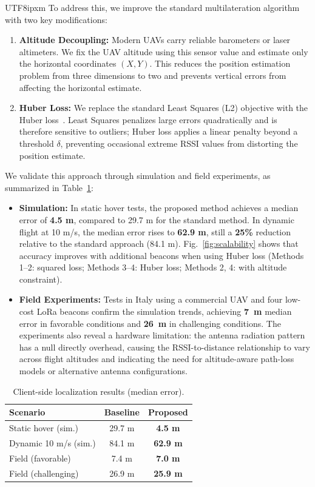 \documentclass[a4paper,10pt,twocolumn]{article}
\begin{document}
\begin{CJK}{UTF8}{ipxm}
To address this, we improve the standard multilateration algorithm with two key modifications:
\begin{enumerate}
    \item \textbf{Altitude Decoupling:} Modern UAVs carry reliable barometers or laser altimeters. We fix the UAV altitude using this sensor value and estimate only the horizontal coordinates $(X, Y)$. This reduces the position estimation problem from three dimensions to two and prevents vertical errors from affecting the horizontal estimate.
    \item \textbf{Huber Loss:} We replace the standard Least Squares (L2) objective with the Huber loss~\cite{huber1964robust}. Least Squares penalizes large errors quadratically and is therefore sensitive to outliers; Huber loss applies a linear penalty beyond a threshold $\delta$, preventing occasional extreme RSSI values from distorting the position estimate.
\end{enumerate}

We validate this approach through simulation and field experiments, as summarized in Table~\ref{tab:ch4}:
\begin{itemize}
    \item \textbf{Simulation:} In static hover tests, the proposed method achieves a median error of \textbf{4.5 m}, compared to 29.7 m for the standard method.
    In dynamic flight at 10 m/s, the median error rises to \textbf{62.9 m}, still a \textbf{25\%} reduction relative to the standard approach (84.1 m).
    Fig.~\ref{fig:scalability} shows that accuracy improves with additional beacons when using Huber loss (Methods 1--2: squared loss; Methods 3--4: Huber loss; Methods 2, 4: with altitude constraint).
    \item \textbf{Field Experiments:} Tests in Italy using a commercial UAV and four low-cost LoRa beacons confirm the simulation trends, achieving \textbf{7~m} median error in favorable conditions and \textbf{26~m} in challenging conditions.
    The experiments also reveal a hardware limitation: the antenna radiation pattern has a null directly overhead, causing the RSSI-to-distance relationship to vary across flight altitudes and indicating the need for altitude-aware path-loss models or alternative antenna configurations.
\end{itemize}

\begin{table}[t]
\centering
\caption{Client-side localization results (median error).}
\label{tab:ch4}
\small
\begin{tabular}{lcc}
\toprule
\textbf{Scenario} & \textbf{Baseline} & \textbf{Proposed} \\
\midrule
Static hover (sim.) & 29.7 m & \textbf{4.5 m} \\
Dynamic 10 m/s (sim.) & 84.1 m & \textbf{62.9 m} \\
Field (favorable) & 7.4 m & \textbf{7.0 m} \\
Field (challenging) & 26.9 m & \textbf{25.9 m} \\
\bottomrule
\end{tabular}
\end{table}


\end{CJK}
\end{document}
